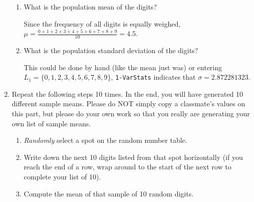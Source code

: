 \documentclass{article}
\newcommand{\answer}[1]{\color{red}#1}
\begin{document}
\begin{enumerate}
	\begin{enumerate}
	
	\item What is the population mean of the digits? 
	
	{\answer Since the frequency of all digits is equally weighed, $\mu = \frac{0+1+2+3+4+5+6+7+8+9}{10} = 4.5$.
	}
	
	\item What is the population standard deviation of the digits? 
	
	{\answer This could be done by hand (like the mean just was) or entering $L_1=\{0, 1, 2, 3, 4, 5, 6, 7, 8, 9\}$, \texttt{1-VarStats} indicates that $\sigma = 2.872281323$.
	} 
	\end{enumerate}
	
\item Repeat the following steps 10 times. In the end, you will have generated 10 different sample means. Please do NOT simply copy a classmate's values on this part, but please do your own work so that you really are generating your own list of sample means. 

	\begin{enumerate}
	
	\item {\em Randomly} select a spot on the random number table.
	
	\item Write down the next 10 digits listed from that spot horizontally (if you reach the end of a row, wrap around to the start of the next row to complete your list of 10). 
	
	\item Compute the mean of that sample of 10 random digits. 
	
	\end{enumerate}

\begin{center}	


\end{center}
\end{enumerate}
\end{document}
